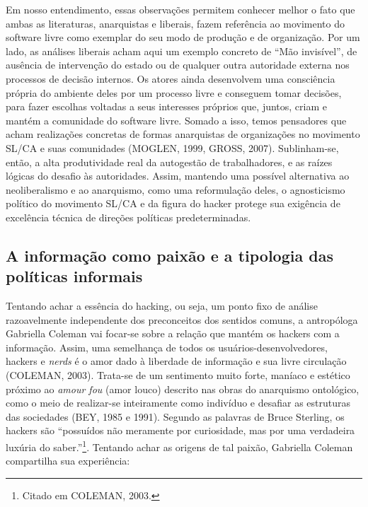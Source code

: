 Em nosso entendimento, essas observações permitem conhecer melhor o fato que ambas as literaturas, anarquistas e liberais, fazem referência ao movimento do software livre como exemplar do seu modo de produção e de organização. Por um lado, as análises liberais acham aqui um exemplo concreto de “Mão invisível”, de ausência de intervenção do estado ou de qualquer outra autoridade externa nos processos de decisão internos. Os atores ainda desenvolvem uma consciência própria do ambiente deles por um processo livre e conseguem tomar decisões, para fazer escolhas voltadas a seus interesses próprios que, juntos, criam e mantém a comunidade do software livre. Somado a isso, temos pensadores que acham realizações concretas de formas anarquistas de organizações no movimento SL/CA e suas comunidades (MOGLEN, 1999, GROSS, 2007). Sublinham-se, então, a alta produtividade real da autogestão de trabalhadores, e as raízes lógicas do desafio às autoridades. Assim, mantendo uma possível alternativa ao neoliberalismo e ao anarquismo, como uma reformulação deles, o agnosticismo político do movimento SL/CA e da figura do hacker protege sua exigência de excelência técnica de direções políticas predeterminadas.

\subsection{A informação como paixão e a tipologia das políticas informais} \label{2.2.2}

Tentando achar a essência do hacking, ou seja, um ponto fixo de análise razoavelmente independente dos preconceitos dos sentidos comuns, a antropóloga Gabriella Coleman vai focar-se sobre a relação que mantém os hackers com a informação. Assim, uma semelhança de todos os usuários-desenvolvedores, hackers e \emph{nerds} é o amor dado à liberdade de informação e sua livre circulação (COLEMAN, 2003). Trata-se de um sentimento muito forte, maníaco e estético próximo ao \emph{amour fou} (amor louco) descrito nas obras do anarquismo ontológico, como o meio de realizar-se inteiramente como indivíduo e desafiar as estruturas das sociedades (BEY, 1985 e 1991). Segundo as palavras de Bruce Sterling, os hackers são “possuídos não meramente por curiosidade, mas por uma verdadeira luxúria do saber.”\footnote{Citado em COLEMAN, 2003.}. Tentando achar as origens de tal paixão, Gabriella Coleman compartilha sua experiência:

